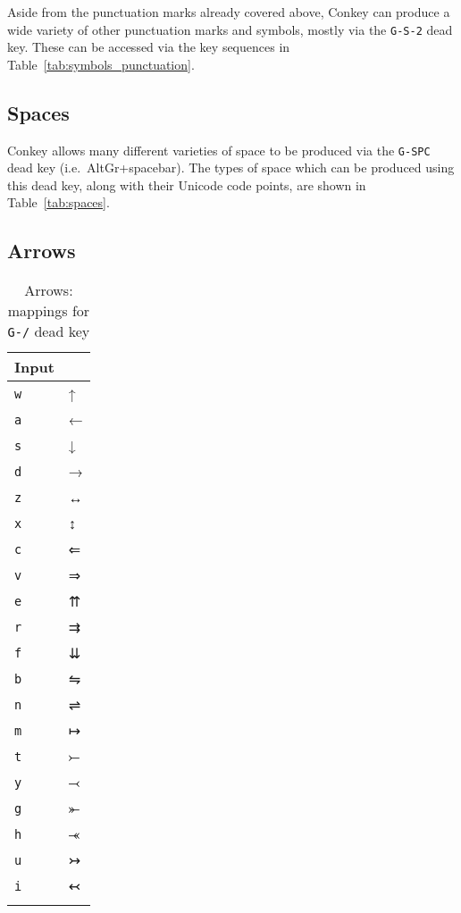 \documentclass[oneside]{memoir}
\newcommand{\key}{\verb}
\newcommand{\keynv}{\texttt}
\begin{document}
Aside from the punctuation marks already covered above,
  Conkey can produce a wide variety of other punctuation marks and symbols,
  mostly via the \key|G-S-2| dead key.
These can be accessed via the key sequences in Table~\ref{tab:symbols_punctuation}.

\subsection{Spaces}
\label{sec:spaces}

Conkey allows many different varieties of space to be produced via the \key|G-SPC| dead key
  (i.e.\ AltGr+spacebar).
The types of space which can be produced using this dead key,
  along with their Unicode code points,
  are shown in Table~\ref{tab:spaces}.

\subsection{Arrows}
\label{sec:arrows}

\begin{table}
\caption{Arrows: mappings for \keynv{G-/} dead key}
\label{tab:arrows}
\centering
\begin{tabular}{l>{\fallbackfontsymbol}l}
\toprule
Input & \multicolumn{1}{l}{Result} \\
\midrule
\key|w| & ↑ \\
\key|a| & ← \\
\key|s| & ↓ \\
\key|d| & → \\
\key|z| & ↔ \\
\key|x| & ↕ \\
\key|c| & ⇐ \\
\key|v| & ⇒ \\
\key|e| & ⇈ \\
\key|r| & ⇉ \\
\key|f| & ⇊ \\
\key|b| & ⇋ \\
\key|n| & ⇌ \\
\key|m| & ↦ \\
\key|t| & ⤚ \\
\key|y| & ⤙ \\
\key|g| & ⤜ \\
\key|h| & ⤛ \\
\key|u| & ↣ \\
\key|i| & ↢ \\
\bottomrule&
\end{tabular}
\end{table}
\end{document}
